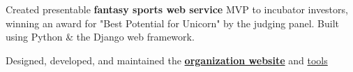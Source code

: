 \documentclass[]{hieudo-build}
\begin{document}
\begin{minipage}[t]{0.65\textwidth}

\vspace{0.9em} %

\begin{tightemize}
\item Created presentable {\bf fantasy sports web service} MVP to
incubator investors, winning an award for "Best Potential for Unicorn"
by the judging panel. Built using Python \& the Django web framework.
\end{tightemize}
\sectionsep


\vspace{\topsep} %

\begin{tightemize}
\item Designed, developed, and maintained the 
{\bf \href{https://www.skullhouse.nyc}{organization website}} and 
\href{https://github.com/JasonYao/Bobst-Room-Automator}{tools}
\end{tightemize}
\sectionsep




\end{minipage}
\end{document}
